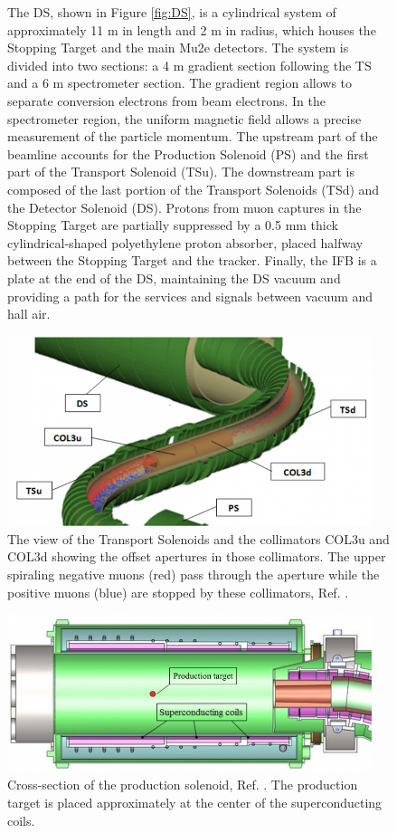 \begin{figure}[!h]
{The DS, shown in Figure \ref{fig:DS}, is a cylindrical system of approximately 11 m in length and 2 m in radius, which houses the Stopping Target and the main Mu2e detectors. The system is divided into two sections: a 4 m gradient section following the TS and a 6 m spectrometer section. The gradient region allows to separate conversion electrons from beam electrons. In the spectrometer region, the uniform magnetic field allows a precise measurement of the particle momentum. The upstream part of the beamline accounts for the Production Solenoid (PS) and the first part of the Transport Solenoid (TSu). The downstream part is composed of the last portion of the Transport Solenoids (TSd) and the Detector Solenoid (DS). Protons from muon captures in the Stopping Target are partially suppressed by a 0.5 mm thick cylindrical-shaped polyethylene proton absorber, placed halfway between the Stopping Target and the tracker. Finally, the IFB is a plate at the end of the DS, maintaining the DS vacuum and providing a path for the services and signals between vacuum and hall air.
}
\label{fig:muonbeamline}
\end{figure}
\begin{figure}[!h]
\centering
\includegraphics[width =0.95\textwidth]{images/chapter2/800px-MuonBeamlineCollimators2.png}
\caption{The view of the Transport Solenoids and the collimators COL3u and COL3d showing the offset apertures in those collimators. The upper spiraling negative muons (red) pass through the aperture while the positive muons (blue) are stopped by these collimators, Ref. \cite{tsview}.}
\label{fig:collimators}
\end{figure}
\begin{figure}[!h]
\centering
\includegraphics[width =0.95\textwidth]{images/chapter2/800px-Production_solenoid.png}
\caption{Cross-section of the production solenoid, Ref. \cite{6376120}.
The production target is placed approximately at the center of the superconducting coils.}
\label{fig:PS}
\end{figure}
